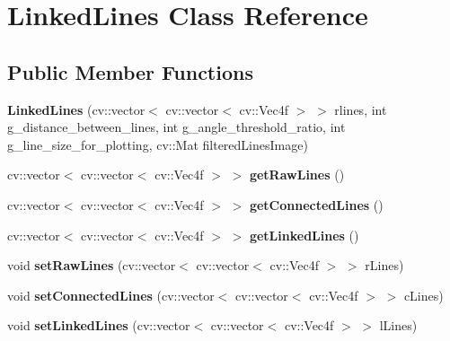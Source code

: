 \hypertarget{classLinkedLines}{
\section{LinkedLines Class Reference}
\label{classLinkedLines}
}
\subsection*{Public Member Functions}
\begin{DoxyCompactItemize}
\item 
\hypertarget{classLinkedLines_a4e794358d4a75b03f77f3f3507d82127}{
{\bfseries LinkedLines} (cv::vector$<$ cv::vector$<$ cv::Vec4f $>$ $>$ rlines, int g\_\-distance\_\-between\_\-lines, int g\_\-angle\_\-threshold\_\-ratio, int g\_\-line\_\-size\_\-for\_\-plotting, cv::Mat filteredLinesImage)}
\label{classLinkedLines_a4e794358d4a75b03f77f3f3507d82127}

\item 
\hypertarget{classLinkedLines_a1855357157ea2fa0e3df79efaf08c15f}{
cv::vector$<$ cv::vector$<$ cv::Vec4f $>$ $>$ {\bfseries getRawLines} ()}
\label{classLinkedLines_a1855357157ea2fa0e3df79efaf08c15f}

\item 
\hypertarget{classLinkedLines_a81567fe814c34bb378aaf89e740f1bff}{
cv::vector$<$ cv::vector$<$ cv::Vec4f $>$ $>$ {\bfseries getConnectedLines} ()}
\label{classLinkedLines_a81567fe814c34bb378aaf89e740f1bff}

\item 
\hypertarget{classLinkedLines_a052e4c4aa0182ccfe10283a13d5d4bb6}{
cv::vector$<$ cv::vector$<$ cv::Vec4f $>$ $>$ {\bfseries getLinkedLines} ()}
\label{classLinkedLines_a052e4c4aa0182ccfe10283a13d5d4bb6}

\item 
\hypertarget{classLinkedLines_a1d64ace06246a0c8a936d8bb367a1a2e}{
void {\bfseries setRawLines} (cv::vector$<$ cv::vector$<$ cv::Vec4f $>$ $>$ rLines)}
\label{classLinkedLines_a1d64ace06246a0c8a936d8bb367a1a2e}

\item 
\hypertarget{classLinkedLines_a0e8392e18661b14ff54c9b6ac79ef134}{
void {\bfseries setConnectedLines} (cv::vector$<$ cv::vector$<$ cv::Vec4f $>$ $>$ cLines)}
\label{classLinkedLines_a0e8392e18661b14ff54c9b6ac79ef134}

\item 
\hypertarget{classLinkedLines_af4d725cfb6d041a727fe8f9abadbc300}{
void {\bfseries setLinkedLines} (cv::vector$<$ cv::vector$<$ cv::Vec4f $>$ $>$ lLines)}
\label{classLinkedLines_af4d725cfb6d041a727fe8f9abadbc300}


\end{DoxyCompactItemize}
